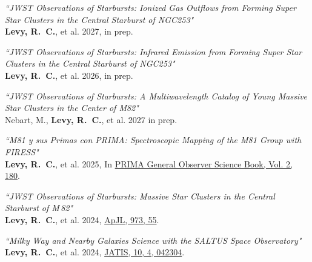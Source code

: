 \documentclass[11pt]{article}
\begin{document}
\begin{etaremune}[itemsep=-18pt]

\item \textit{``JWST Observations of Starbursts: Ionized Gas Outflows from Forming Super Star Clusters in the Central Starburst of NGC253"}\\
{\bf Levy, R.~C.}, et al. 2027, in prep. \smallskip\\ 

\item \textit{``JWST Observations of Starbursts: Infrared Emission from Forming Super Star Clusters in the Central Starburst of NGC253"}\\
{\bf Levy, R.~C.}, et al. 2026, in prep. \smallskip\\ 

\item \textit{``JWST Observations of Starbursts: A Multiwavelength Catalog of Young Massive Star Clusters in the Center of M82"}\\
Nebart, M., {\bf Levy, R.~C.}, et al. 2027 in prep. \smallskip\\ 

\item \textit{``M81 y sus Primas con PRIMA: Spectroscopic Mapping of the M81 Group with FIRESS"}\\
{\bf Levy, R.~C.}, et al. 2025, In \href{https://ui.adsabs.harvard.edu/abs/2025prim.book..180L/abstract}{PRIMA General Observer Science Book, Vol. 2, 180}. \smallskip\\ 

\item \textit{``JWST Observations of Starbursts: Massive Star Clusters in the Central Starburst of M\,82"}\\
{\bf Levy, R.~C.}, et al. 2024, \href{https://ui.adsabs.harvard.edu/abs/2024arXiv240804135L/abstract}{ApJL, 973, 55}. \smallskip\\ 

\item \textit{``Milky Way and Nearby Galaxies Science with the SALTUS Space Observatory"}\\
{\bf Levy, R.~C.}, et al. 2024, \href{https://ui.adsabs.harvard.edu/abs/2024arXiv240416984L/abstract}{JATIS, 10, 4, 042304}.\smallskip\\


\end{etaremune}
\end{document}
